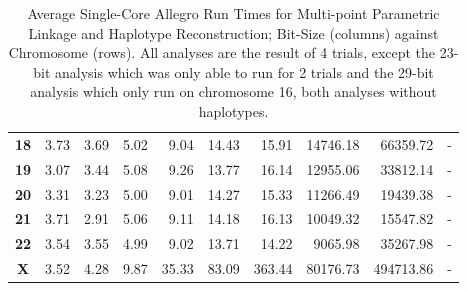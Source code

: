\begin{table}[h]
\begin{center}
\begin{tabular}{crrrrrrrrr}
\textbf{18}                        & 3.73                           & 3.69                           & 5.02                           & 9.04                           & 14.43                           & 15.91                           & 14746.18                        & 66359.72                         & -                                \\
\textbf{19}                        & 3.07                           & 3.44                           & 5.08                           & 9.26                           & 13.77                           & 16.14                           & 12955.06                        & 33812.14                         & -                                \\
\textbf{20}                        & 3.31                           & 3.23                           & 5.00                           & 9.01                           & 14.27                           & 15.33                           & 11266.49                        & 19439.38                         & -                                \\
\textbf{21}                        & 3.71                           & 2.91                           & 5.06                           & 9.11                           & 14.18                           & 16.13                           & 10049.32                        & 15547.82                         & -                                \\
\textbf{22}                        & 3.54                           & 3.55                           & 4.99                           & 9.02                             & 13.71                           & 14.22                           & 9065.98                         & 35267.98                         & -                                \\
\textbf{X}                         & 3.52                           & 4.28                            & 9.87                           & 35.33                          & 83.09                           & 363.44                          & 80176.73                        & 494713.86                        & -                               \\
\hline
\end{tabular}
\end{center}
\vspace{-15pt}
\caption{Average Single-Core Allegro Run Times for Multi-point Parametric Linkage and Haplotype Reconstruction; Bit-Size (columns) against Chromosome (rows). All analyses are the result of 4 trials, except the 23-bit analysis which was only able to run for 2 trials and the 29-bit analysis which only run on chromosome 16, both analyses without haplotypes.}\label{table:res:allegrosinglechroms}
\end{table}


